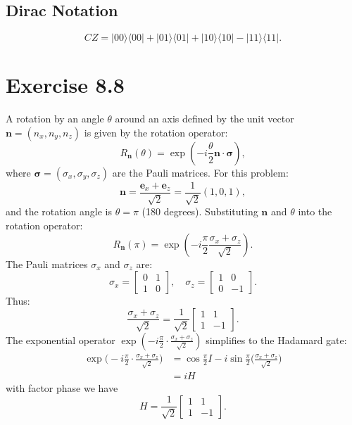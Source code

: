 \documentclass{article}
\begin{document}
\subsection*{Dirac Notation}
\[
CZ = |00\rangle \langle 00| + |01\rangle \langle 01| + |10\rangle \langle 10| - |11\rangle \langle 11|.
\]

\section*{Exercise 8.8}

A rotation by an angle \(\theta\) around an axis defined by the unit vector \(\mathbf{n} = (n_x, n_y, n_z)\) is given by the rotation operator:
\[
R_{\mathbf{n}}(\theta) = \exp\left(-i \frac{\theta}{2} \mathbf{n} \cdot \mathbf{\sigma} \right),
\]
where \(\mathbf{\sigma} = (\sigma_x, \sigma_y, \sigma_z)\) are the Pauli matrices.
For this problem:
\[
\mathbf{n} = \frac{\mathbf{e}_x + \mathbf{e}_z}{\sqrt{2}} = \frac{1}{\sqrt{2}} (1, 0, 1),
\]
and the rotation angle is \(\theta = \pi\) (180 degrees).
Substituting \(\mathbf{n}\) and \(\theta\) into the rotation operator:
\[
R_{\mathbf{n}}(\pi) = \exp\left(-i \frac{\pi}{2} \frac{\sigma_x + \sigma_z}{\sqrt{2}} \right).
\]
The Pauli matrices \(\sigma_x\) and \(\sigma_z\) are:
\[
\sigma_x = \begin{bmatrix} 0 & 1 \\ 1 & 0 \end{bmatrix}, \quad \sigma_z = \begin{bmatrix} 1 & 0 \\ 0 & -1 \end{bmatrix}.
\]
Thus:
\[
\frac{\sigma_x + \sigma_z}{\sqrt{2}} = \frac{1}{\sqrt{2}}\begin{bmatrix} 1 & 1 \\ 1 & -1 \end{bmatrix}.
\]
The exponential operator \(\exp\left(-i \frac{\pi}{2} \cdot \frac{\sigma_x + \sigma_z}{\sqrt{2}} \right)\) simplifies to the Hadamard gate:
\begin{align*}
    \exp\big(-i \frac{\pi}{2} \cdot \frac{\sigma_x + \sigma_z}{\sqrt{2}}\big) &= \cos\frac{\pi}{2}I - i \sin\frac{\pi}{2}\big(\frac{\sigma_x + \sigma_z}{\sqrt{2}}\big) \\
    &= iH
\end{align*}
with factor phase we have
\[
H = \frac{1}{\sqrt{2}} \begin{bmatrix} 1 & 1 \\ 1 & -1 \end{bmatrix}.
\]
\end{document}
